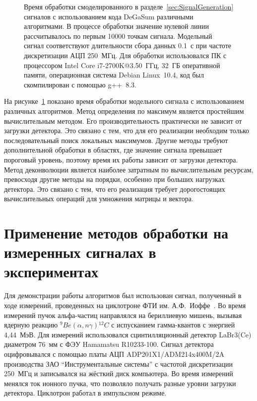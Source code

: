 \begin{figure}[ht!]
  \caption{ Время обработки смоделированного в разделе~\ref{sec:SignalGeneration} сигналов с использованием кода DeGaSum различными алгоритмами. В процессе обработки значение нулевой линии рассчитывалось по первым 10000 точкам сигнала. Модельный сигнал соответствуют длительности сбора данных 0.1~с при частоте дискретизации АЦП 250~МГц. Для обработки использовался ПК с процессором Intel Core i7-2700K@3.50~ГГц, 32~ГБ оперативной памяти, операционная система Debian Linux~10.4, код был скомпилирован с помощью g++~8.3.~\cite{Khilkevitch2020} }
  \label{fig:processingTime}
\end{figure}

На рисунке~\ref{fig:processingTime} показано время обработки модельного сигнала с использованием различных алгоритмов. Метод определения по максимум является простейшим вычислительным методом. Его производительность практически не зависит от загрузки детектора. Это связано с тем, что для его реализации необходим только последовательный поиск локальных максимумов. Другие методы требуют дополнительной обработки в областях, где значение сигнала превышает пороговый уровень, поэтому время их работы зависит от загрузки детектора. Метод деконволюции является наиболее затратным по вычислительным ресурсам, превосходя другие методы на порядки, особенно при больших нагрузках детектора. Это связано с тем, что его реализация требует дорогостоящих вычислительных операций для умножения матрицы и вектора.~\cite{Khilkevitch2020}


\section{Применение методов обработки на измеренных сигналах в экспериментах}

Для демонстрации работы алгоритмов был использован сигнал, полученный в ходе измерений, проведенных на циклотроне ФТИ им. А.Ф.~Иоффе~\cite{Lemberg1987}. Во время измерений пучок альфа-частиц направлялся на бериллиевую мишень, вызывая ядерную реакцию ${}^9Be(\alpha,n\gamma){}^{12}C$ с испусканием гамма-квантов с энергией 4,44~МэВ. Для измерений использовался сцинтилляционный детектор LaBr3(Ce) диаметром 76~мм с ФЭУ Hamamatsu R10233-100. Сигнал детектора оцифровывался с помощью платы АЦП ADP201X1/ADM214x400M/2A производства ЗАО ``Инструментальные системы'' с частотой дискретизации 250~МГц и записывался на жёсткий диск компьютера. Во время измерений менялся ток ионного пучка, что позволяло получать разные уровни загрузки детектора. Циклотрон работал в импульсном режиме.

